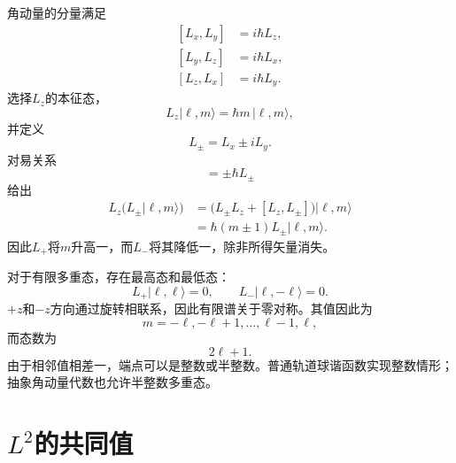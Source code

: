 角动量的分量满足
\begin{equation}
\begin{aligned}
[L_x,L_y]&=i\hbar L_z,\\
[L_y,L_z]&=i\hbar L_x,\\
[L_z,L_x]&=i\hbar L_y.
\end{aligned}
\end{equation}
选择\(L_z\)的本征态，
\begin{equation}
L_z|\ell,m\rangle=\hbar m\,|\ell,m\rangle,
\end{equation}
并定义
\begin{equation}
L_\pm=L_x\pm iL_y.
\end{equation}
对易关系
\begin{equation}
[L_z,L_\pm]=\pm\hbar L_\pm
\end{equation}
给出
\begin{align}
L_z\bigl(L_\pm|\ell,m\rangle\bigr)
&=\bigl(L_\pm L_z+[L_z,L_\pm]\bigr)|\ell,m\rangle \\
&=\hbar(m\pm1)L_\pm|\ell,m\rangle.
\end{align}
因此\(L_+\)将\(m\)升高一，而\(L_-\)将其降低一，除非所得矢量消失。

对于有限多重态，存在最高态和最低态：
\begin{equation}
L_+|\ell,\ell\rangle=0,
\qquad
L_-|\ell,-\ell\rangle=0.
\end{equation}
\(+z\)和\(-z\)方向通过旋转相联系，因此有限谱关于零对称。其值因此为
\begin{equation}
m=-\ell,-\ell+1,\ldots,\ell-1,\ell,
\end{equation}
而态数为
\begin{equation}
2\ell+1.
\end{equation}
由于相邻值相差一，端点可以是整数或半整数。普通轨道球谐函数实现整数情形；抽象角动量代数也允许半整数多重态。

\begin{classroomqa}
\end{classroomqa}

\section{\texorpdfstring{\(L^2\)}{L平方}的共同值}

